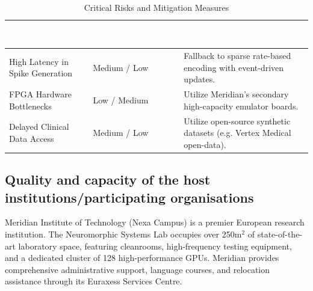 \documentclass[11pt,a4paper]{article}
\begin{document}
\begin{table}[h]
\centering
\caption{Critical Risks and Mitigation Measures}
\label{tab:risks}
\vspace{0.2cm}
\begin{tabularx}{\textwidth}{lXX}
  \toprule
  \rowcolor{MSCAGold} \textcolor{white}{\textbf{Risk Description}} & \textcolor{white}{\textbf{Impact/Probability}} & \textcolor{white}{\textbf{Proposed Mitigation Measure}} \\ \midrule
  High Latency in Spike Generation & Medium / Low & Fallback to sparse rate-based encoding with event-driven updates. \\
  FPGA Hardware Bottlenecks & Low / Medium & Utilize Meridian's secondary high-capacity emulator boards. \\
  Delayed Clinical Data Access & Medium / Low & Utilize open-source synthetic datasets (e.g. Vertex Medical open-data). \\ \bottomrule
\end{tabularx}
\end{table}

\subsection{Quality and capacity of the host institutions/participating organisations}
Meridian Institute of Technology (Nexa Campus) is a premier European research institution. The Neuromorphic Systems Lab occupies over 250m$^2$ of state-of-the-art laboratory space, featuring cleanrooms, high-frequency testing equipment, and a dedicated cluster of 128 high-performance GPUs. Meridian provides comprehensive administrative support, language courses, and relocation assistance through its Euraxess Services Centre.
\end{document}
